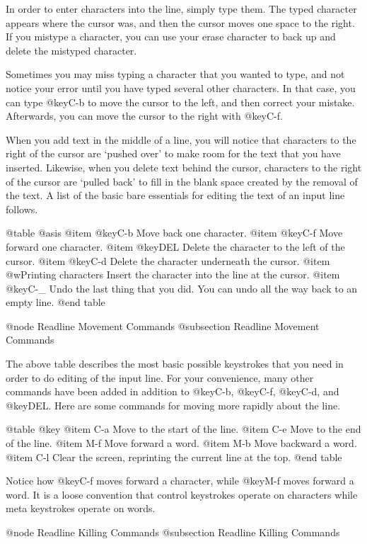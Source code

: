 In order to enter characters into the line, simply type them.  The typed
character appears where the cursor was, and then the cursor moves one
space to the right.  If you mistype a character, you can use your
erase character to back up and delete the mistyped character.

Sometimes you may miss typing a character that you wanted to type, and
not notice your error until you have typed several other characters.  In
that case, you can type @key{C-b} to move the cursor to the left, and then
correct your mistake.  Afterwards, you can move the cursor to the right
with @key{C-f}.

When you add text in the middle of a line, you will notice that characters
to the right of the cursor are `pushed over' to make room for the text
that you have inserted.  Likewise, when you delete text behind the cursor,
characters to the right of the cursor are `pulled back' to fill in the
blank space created by the removal of the text.  A list of the basic bare
essentials for editing the text of an input line follows.

@table @asis
@item @key{C-b}
Move back one character.
@item @key{C-f}
Move forward one character.
@item @key{DEL}
Delete the character to the left of the cursor.
@item @key{C-d}
Delete the character underneath the cursor.
@item @w{Printing characters}
Insert the character into the line at the cursor.
@item @key{C-_}
Undo the last thing that you did.  You can undo all the way back to an
empty line.
@end table

@node Readline Movement Commands
@subsection Readline Movement Commands


The above table describes the most basic possible keystrokes that you need
in order to do editing of the input line.  For your convenience, many
other commands have been added in addition to @key{C-b}, @key{C-f},
@key{C-d}, and @key{DEL}.  Here are some commands for moving more rapidly
about the line.

@table @key
@item C-a
Move to the start of the line.
@item C-e
Move to the end of the line.
@item M-f
Move forward a word.
@item M-b
Move backward a word.
@item C-l
Clear the screen, reprinting the current line at the top.
@end table

Notice how @key{C-f} moves forward a character, while @key{M-f} moves
forward a word.  It is a loose convention that control keystrokes
operate on characters while meta keystrokes operate on words.

@node Readline Killing Commands
@subsection Readline Killing Commands

